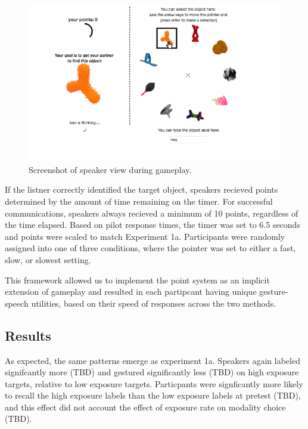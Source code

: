 \documentclass[10pt, letterpaper]{article}
\newenvironment{CodeChunk}{}{}
\begin{document}
\begin{CodeChunk}
\captionsetup{width=0.8\columnwidth}\begin{figure}[H]

{\centering \includegraphics{figs/image-1} 

}

\caption[Screenshot of speaker view during gameplay]{Screenshot of speaker view during gameplay.}\label{fig:image}
\end{figure}
\end{CodeChunk}

If the listner correctly identified the target object, speakers recieved
points determined by the amount of time remaining on the timer. For
successful communications, speakers always recieved a minimum of 10
points, regardless of the time elapsed. Based on pilot response times,
the timer was set to 6.5 seconds and points were scaled to match
Experiment 1a. Participants were randomly assigned into one of three
conditions, where the pointer was set to either a fast, slow, or slowest
setting.

This framework allowed us to implement the point system as an implicit
extension of gameplay and resulted in each partipcant having unique
gesture-speech utilities, based on their speed of responses across the
two methods.

\subsection{Results}\label{results-1}

As expected, the same patterns emerge as experiment 1a. Speakers again
labeled signifcantly more (TBD) and gestured significantly less (TBD) on
high exposure targets, relative to low exposure targets. Particpants
were signficantly more likely to recall the high exposure labels than
the low exposure labels at pretest (TBD), and this effect did not
account the effect of exposure rate on modality choice (TBD).
\end{document}
